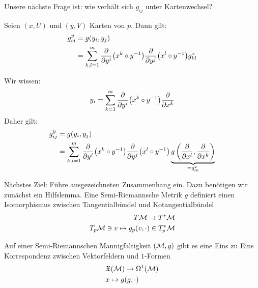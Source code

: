 Unsere nächste Frage ist: wie verhält sich $g_{ij}$ unter Kartenwechsel?
\begin{lem}[Transformationsregel]
\label{lem:Transformationsregel}
Seien $(x, U)$ und $(y, V)$ Karten von $p$.
Dann gilt:
\begin{align*}
g^{y}_{ij} &= g(y_i, y_j)\\
&= \sum^m_{k,l = 1} \pdv{y^i}(x^k \circ y^{-1}) \pdv{y^j} (x^l \circ y^{-1}) g^x_{kl}
\end{align*}
\end{lem}
\begin{bew}
Wir wissen:
\begin{align*}
y_i = \sum^m_{k=1} \pdv{y^i} (x^k \circ y^{-1}) \pdv{x^k}
\end{align*}
Daher gilt:
\begin{align*}
g^y_{ij} &= g(y_i, y_j)\\
&= \sum^m_{k,l = 1} \pdv{y^i}(x^k \circ y^{-1}) \pdv{y^j} (x^l \circ y^{-1}) \underbrace{g\left( \pdv{x^l}, \pdv{x^k} \right)}_{= g^x_{lk}}
\end{align*}
\end{bew}

Nächstes Ziel: Führe ausgezeichneten Zusammenhang ein.
Dazu benötigen wir zunächst ein Hilfslemma.
Eine Semi-Riemannsche Metrik $g$ definiert einen Isomorphismus zwischen Tangentialbündel und Kotangentialbündel
\begin{align}
T \mathcal{M} \to T^\ast \mathcal{M}\\
T_p \mathcal{M} \ni v \mapsto g_p (v, \cdot) \in T^\ast_p \mathcal{M}
\end{align}

\begin{hlem}
\label{hlem:formvfkorrespondenz}
Auf einer Semi-Riemannschen Mannigfaltigkeit $(\mathcal{M}, g)$ gibt es eine Eins zu Eins Korrespondenz zwischen Vektorfeldern und $1$-Formen
\begin{align}
&\mathfrak{X}(\mathcal{M}) \to \Omega^1 (\mathcal{M})\\
& x \mapsto g(g, \cdot)
\end{align}
\end{hlem}

